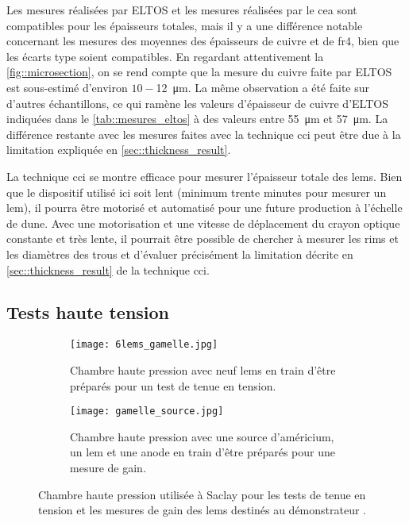         Les mesures réalisées par ELTOS et les mesures réalisées par le \gls{cea} sont compatibles pour les épaisseurs totales, mais il y a une différence notable concernant les mesures des moyennes des épaisseurs de cuivre et de \gls{fr4}, bien que les écarts type soient compatibles. En regardant attentivement la \autoref{fig::microsection}, on se rend compte que la mesure du cuivre faite par ELTOS est sous-estimé d'environ $10-$\SI{12}{\micro\meter}. La même observation a été faite sur d'autres échantillons, ce qui ramène les valeurs d'épaisseur de cuivre d'ELTOS indiquées dans le \autoref{tab::mesures_eltos} à des valeurs entre \SI{55}{\micro\meter} et \SI{57}{\micro\meter}. La différence restante avec les mesures faites avec la technique \gls{cci} peut être due à la limitation expliquée en \autoref{sec::thickness_result}.
            
        La technique \gls{cci} se montre efficace pour mesurer l'épaisseur totale des \glspl{lem}. Bien que le dispositif utilisé ici soit lent (minimum trente minutes pour mesurer un \gls{lem}), il pourra être motorisé et automatisé pour une future production à l'échelle de \gls{dune}. Avec une motorisation et une vitesse de déplacement du crayon optique constante et très lente, il pourrait être possible de chercher à mesurer les rims et les diamètres des trous et d'évaluer précisément la limitation décrite en \autoref{sec::thickness_result} de la technique \gls{cci}.
        
    \subsection{Tests haute tension}\label{sec::test_HT}
        
      \begin{figure}[htpb]
        \begin{subfigure}[t]{0.48\textwidth}
          \texttt{[image: 6lems\_gamelle.jpg]}
          \caption{\label{fig::6lems_gamelle}Chambre haute pression avec neuf \glspl{lem} en train d'être préparés pour un test de tenue en tension.}
        \end{subfigure}
        \hfill
        \begin{subfigure}[t]{0.48\textwidth}
          \texttt{[image: gamelle\_source.jpg]}
          \caption{\label{fig::gamelle_source}Chambre haute pression avec une source d'américium, un \gls{lem} et une anode en train d'être préparés pour une mesure de gain.}
        \end{subfigure}
        \caption[Chambre haute pression]{\label{fig::gamelle}Chambre haute pression utilisée à Saclay pour les tests de tenue en tension et les mesures de gain des \glspl{lem} destinés au démonstrateur \SSS{}.}
      \end{figure}

